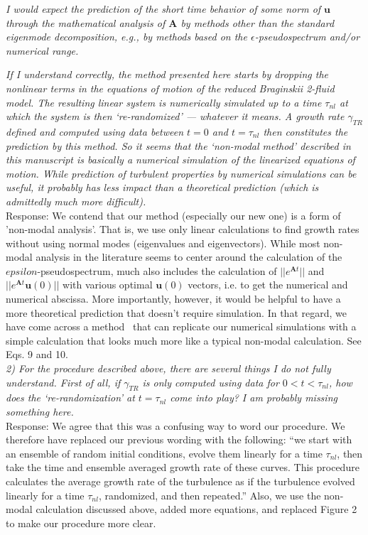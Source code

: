 \documentclass[12pt]{article}
\begin{document}
\emph{I would expect the prediction of the short time behavior of some norm of $\mathbf{u}$ through the mathematical analysis of $\mathbf{A}$
by methods other than the standard eigenmode decomposition, e.g., by methods based on the $\epsilon$-pseudospectrum and/or numerical range.}

\emph{If I understand correctly, the method presented here starts by dropping the nonlinear terms in
the equations of motion of the reduced Braginskii 2-fluid model. The resulting linear system is
numerically simulated up to a time $\tau_{nl}$ at which the system is then ‘re-randomized’ — whatever
it means. A growth rate $\gamma_{TR}$ defined and computed using data between $t = 0$ and $t = \tau_{nl}$ then
constitutes the prediction by this method. So it seems that the ‘non-modal method’ described in
this manuscript is basically a numerical simulation of the linearized equations of motion. While
prediction of turbulent properties by numerical simulations can be useful, it probably has less
impact than a theoretical prediction (which is admittedly much more difficult).} \\

Response: We contend that our method (especially our new one) is a form of 'non-modal analysis'. That is, we use only linear calculations to find growth rates without using normal modes (eigenvalues and eigenvectors). While most non-modal analysis in the literature seems to center around the calculation of the $epsilon$-pseudospectrum, much also includes the calculation of $||e^{\mathbf{A} t}||$ and $||e^{\mathbf{A} t} \mathbf{u}(0)||$ with various optimal $\mathbf{u}(0)$ vectors, i.e. to get the numerical and numerical abscissa. More importantly, however, it would be helpful to have a more theoretical prediction that doesn't require simulation. In that regard, we have come across a method~\cite{camargo1998} that can replicate our numerical simulations with a simple calculation that looks much more like a typical non-modal calculation. See Eqs. 9 and 10. \\

\emph{2) For the procedure described above, there are several things I do not fully understand. First of
all, if $\gamma_{TR}$ is only computed using data for $0 < t < \tau_{nl}$, how does the ‘re-randomization’ at $t = \tau_{nl}$
come into play? I am probably missing something here.} \\


Response: We agree that this was a confusing way to word our procedure. We therefore have replaced our previous wording with the following: ``we start with an ensemble of random initial conditions, evolve them linearly for a time $\tau_{nl}$, then take the time and ensemble averaged growth rate of these curves. This procedure calculates the average growth rate of the turbulence as if the turbulence evolved linearly for a time $\tau_{nl}$, randomized, and then repeated.'' 
Also, we use the non-modal calculation discussed above, added more equations, and replaced Figure 2 to make our procedure more clear.
\\
\end{document}
